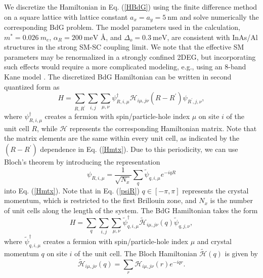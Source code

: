\documentclass[twocolumn,aps,prb,nofootinbib]{revtex4-2}
\begin{document}
We discretize the Hamiltonian in Eq. (\ref{HBdG}) using the finite difference method \cite{Smith2008} on a square lattice with lattice constant $a_x = a_y = 5~\text{nm}$ and solve numerically the corresponding BdG problem. The model parameters used in the calculation, $m^* = 0.026~m_e$, $\alpha_R = 200~\text{meV \AA}$, and $\Delta_o = 0.3~\text{meV}$, are consistent with InAs/Al structures in the strong SM-SC coupling limit. We note that the effective SM parameters may be renormalized in a strongly confined 2DEG, but incorporating such effects would require a more complicated modeling, e.g., using an 8-band Kane model \cite{Kane1957}. The discretized BdG Hamiltonian can be written in second quantized form as
\begin{equation}
    H = 
    \sum_{R,R^\prime} \sum_{i,j} \sum_{\mu,\nu}
    \psi^\dagger_{R,i,\mu} \mathcal{H}_{i\mu,j\nu}(R - R^\prime) \psi_{R^\prime,j,\nu}, \label{Hmtx}
\end{equation}
where $\psi^\dagger_{R,i,\mu}$ creates a fermion with spin/particle-hole index $\mu$ on site $i$ of the unit cell $R$, while $\mathcal{H}$ represents the corresponding Hamiltonian matrix. Note that the matrix elements are the same within every unit cell, as indicated by the $(R - R^\prime)$ dependence in Eq. (\ref{Hmtx}). Due to this periodicity, we can use Bloch's theorem by introducing the representation
\begin{equation}
    \psi_{R,i,\mu} = \frac{1}{\sqrt{N_x}} 
    \sum_q \widetilde{\psi}_{q,i,\mu} e^{-i q R} \label{psiR}
\end{equation}
into Eq. (\ref{Hmtx}). Note that in Eq. (\ref{psiR})  $q \in \left[-\pi,\pi\right]$ represents the crystal momentum, which is restricted to the first Brillouin zone, and $N_x$ is the number of unit cells along the length of the system. The BdG Hamiltonian takes the form
\begin{equation}
    H = 
    \sum_{q} \sum_{i,j} \sum_{\mu,\nu}
    \widetilde{\psi}^\dagger_{q,i,\mu} \widetilde{\mathcal{H}}_{i\mu,j\nu}(q) \widetilde{\psi}_{q,j,\nu}, \label{Hmtx2}
\end{equation}
where $\widetilde{\psi}_{q,i,\mu}^\dagger$ creates a fermion with spin/particle-hole index $\mu$ and crystal momentum $q$ on site $i$ of the unit cell. The Bloch Hamiltonian $\widetilde{\mathcal{H}}(q)$ is given by
\begin{equation}
    \widetilde{\mathcal{H}}_{i\mu,j\nu}(q) = 
    \sum_r \mathcal{H}_{i\mu,j\nu}(r) e^{-iqr}. \label{H_Bloch}
\end{equation}
\end{document}
